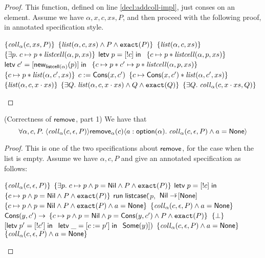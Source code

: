 \begin{proof}
  This function, defined on line \ref{decl:addcoll-impl}, just conses on an element. 
Assume we have $\alpha, x, c, xs, P$, and then proceed with the following proof, in
annotated specification style. 

\begin{specification}
\nextline $\{{\mathit{coll}_\alpha(c, xs, P)}\}$ 
\nextline $\{{\mathit{list}(\alpha, c, xs) \land P \land \mathtt{exact}({P})}\}$ 
\nextline $\{{\mathit{list}(\alpha, c, xs)}\}$ 
\nextline $\{{\exists p.\; c \mapsto p * \mathit{listcell}(\alpha, p, xs)}\}$ 
\nextline $\mathsf{letv}\;p = [!c]\;\mathsf{in}\;$ 
\nextline $\{{c \mapsto p * \mathit{listcell}(\alpha, p, xs)}\}$ 
\nextline $\mathsf{letv}\;c' = [\mathsf{new}_{\mathsf{listcell}(\alpha)}(p)]\;\mathsf{in}\;$
\nextline $\{{c \mapsto p * c' \mapsto p * \mathit{listcell}(\alpha, p, xs)}\}$ 
\nextline $\{{c \mapsto p * \mathit{list}(\alpha, c', xs)}\}$ 
\nextline $c := \mathsf{Cons}(x, c')$ 
\nextline $\{{c \mapsto \mathsf{Cons}(x, c') * \mathit{list}(\alpha, c', xs)}\}$ 
\nextline $\{{\mathit{list}(\alpha, c, x\cdot xs)}\}$ 
\nextline $\{{\exists Q.\; \mathit{list}(\alpha, c, x\cdot xs) \land Q \land \mathtt{exact}({Q})}\}$ 
\nextline $\{{\exists Q.\; \mathit{coll}_\alpha(c, x\cdot xs, Q)}\}$ 
\end{specification}
\end{proof}

\begin{lemma}{(Correctness of $\mathsf{remove}$, part 1)}
We have that 
\begin{displaymath}
  \forall \alpha, c, P.\; \langle{\mathit{coll}_\alpha(c, \epsilon, P)}\rangle{\mathsf{remove}_\alpha(c)}\langle{a:\mathsf{option }{(\alpha)}}.\;{\mathit{coll}_\alpha(c, \epsilon, P) \land a = \mathsf{None}}\rangle
\end{displaymath}
\end{lemma}

\begin{proof}
  This is one of the two specifications about $\mathsf{remove}$, for the case
  when the list is empty. Assume we have $\alpha, c, P$ and give an annotated
  specification as follows: 

\begin{specification}
\nextline $\{{\mathit{coll}_\alpha(c, \epsilon, P)}\}$ 
\nextline $\{{\exists p.\; c \mapsto p \land p = \mathsf{Nil} \land P \land \mathtt{exact}({P})}\}$ 
\nextline $\mathsf{letv}\;p = [!c]\;\mathsf{in}\;$ 
\nextline $\{{c \mapsto p \land p = \mathsf{Nil} \land P \land \mathtt{exact}({P})}\}$ 
\nextline $\mathsf{run}\;\mathsf{listcase}($\=$p,$ 
\nextline \> $\mathsf{Nil} \to $\=$[\mathsf{None}]$ 
\nextline \> \> $\{{c \mapsto p \land p = \mathsf{Nil} \land P \land \mathtt{exact}({P}) \land a = \mathsf{None}}\}$ 
\nextline \> \> $\{{\mathit{coll}_\alpha(c, \epsilon, P) \land a = \mathsf{None}}\}$ 
\nextline \> $\mathsf{Cons}(y, c') \to $ 
\nextline \> \> $\{{c \mapsto p \land p = \mathsf{Nil} \land p = \mathsf{Cons}(y, c') \land P \land \mathtt{exact}({P})}\}$ 
\nextline \> \> $\{{\bot}\}$ 
\nextline \> \> $[\mathsf{letv}\;p' = [!c']\;\mathsf{in}\;$ 
\nextline \> \> $\mathsf{letv}\;\_ = [c := p']\;\mathsf{in}\;$ 
\nextline \> \> $\mathsf{Some}(y)])$
\nextline \> \> $\{{\mathit{coll}_\alpha(c, \epsilon, P) \land a = \mathsf{None}}\}$ 
\nextline $\{{\mathit{coll}_\alpha(c, \epsilon, P) \land a = \mathsf{None}}\}$ 
\end{specification}
\end{proof}

